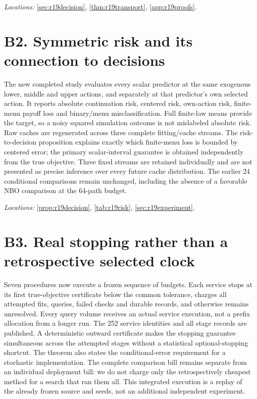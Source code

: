 \documentclass[ecta,nameyear,draft]{econsocart}
\theoremstyle{definition}
\theoremstyle{remark}
\begin{document}
\noindent\emph{Locations:} \ref{sec:r19decision}, \ref{thm:r19transport}, \ref{app:r19proofs}.

\section*{B2. Symmetric risk and its connection to decisions}
The new completed study evaluates every scalar predictor at the same exogenous lower, middle and upper actions, and separately at that predictor's own selected action. It reports absolute continuation risk, centered risk, own-action risk, finite-menu payoff loss and binary/menu misclassification. Full finite-law means provide the target, so a noisy squared simulation outcome is not mislabeled absolute risk. Raw caches are regenerated across three complete fitting/cache streams. The risk-to-decision proposition explains exactly which finite-menu loss is bounded by centered error; the primary scalar-interval guarantee is obtained independently from the true objective. Three fixed streams are retained individually and are not presented as precise inference over every future cache distribution. The earlier 24 conditional comparisons remain unchanged, including the absence of a favorable NBO comparison at the 64-path budget.

\noindent\emph{Locations:} \ref{prop:r19decision}, \ref{tab:r19risk}, \ref{sec:r19experiment}.

\section*{B3. Real stopping rather than a retrospective selected clock}
Seven procedures now execute a frozen sequence of budgets. Each service stops at its first true-objective certificate below the common tolerance, charges all attempted fits, queries, failed checks and durable records, and otherwise remains unresolved. Every query volume receives an actual service execution, not a prefix allocation from a longer run. The 252 service identities and all stage records are published. A deterministic outward certificate makes the stopping guarantee simultaneous across the attempted stages without a statistical optional-stopping shortcut. The theorem also states the conditional-error requirement for a stochastic implementation. The complete comparison bill remains separate from an individual deployment bill: we do not charge only the retrospectively cheapest method for a search that ran them all. This integrated execution is a replay of the already frozen source and seeds, not an additional independent experiment.
\end{document}
